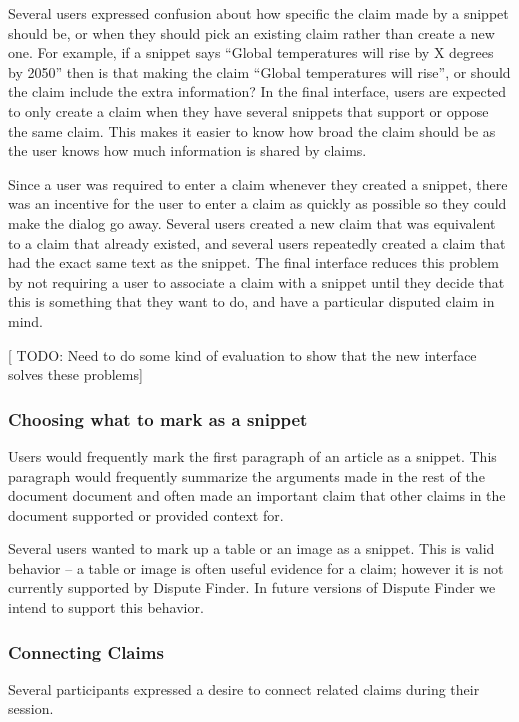 \documentclass{www2010-submission}
\newcommand{\todo}[1]{{[\color{blue} TODO: #1]}}
\begin{document}
Several users expressed confusion about how specific the claim made by a snippet should be, or when they should pick an existing claim rather than create a new one. For example, if a snippet says ``Global temperatures will rise by X degrees by 2050'' then is that making the claim ``Global temperatures will rise'', or should the claim include the extra information? In the final interface, users are expected to only create a claim when they have several snippets that support or oppose the same claim. This makes it easier to know how broad the claim should be as the user knows how much information is shared by claims.

Since a user was required to enter a claim whenever they created a snippet, there was an incentive for the user to enter a claim as quickly as possible so they could make the dialog go away. 
Several users created a new claim that was equivalent to a claim that already existed, and several users repeatedly created a claim that had the exact same text as the snippet. The final interface reduces this problem by not requiring a user to associate a claim with a snippet until they decide that this is something that they want to do, and have a particular disputed claim in mind.

\todo{Need to do some kind of evaluation to show that the new interface solves these problems}


\subsubsection{Choosing what to mark as a snippet}

Users would frequently mark the first paragraph of an article as a snippet. This paragraph would frequently summarize the arguments made in the rest of the document document and often made an important claim that other claims in the document supported or provided context for. 

Several users wanted to mark up a table or an image as a snippet. This is valid behavior -- a table or image is often useful evidence for a claim; however it is not currently supported by Dispute Finder. In future versions of Dispute Finder we intend to support this behavior.


\subsubsection{Connecting Claims}

Several participants expressed a desire to connect related claims during their session. 
\end{document}
